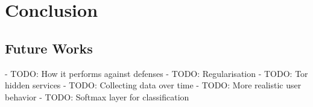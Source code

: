 \chapter{Conclusion}

\section{Future Works}
- TODO: How it performs against defenses
- TODO: Regularisation
- TODO: Tor hidden services
- TODO: Collecting data over time
- TODO: More realistic user behavior
- TODO: Softmax layer for classification
